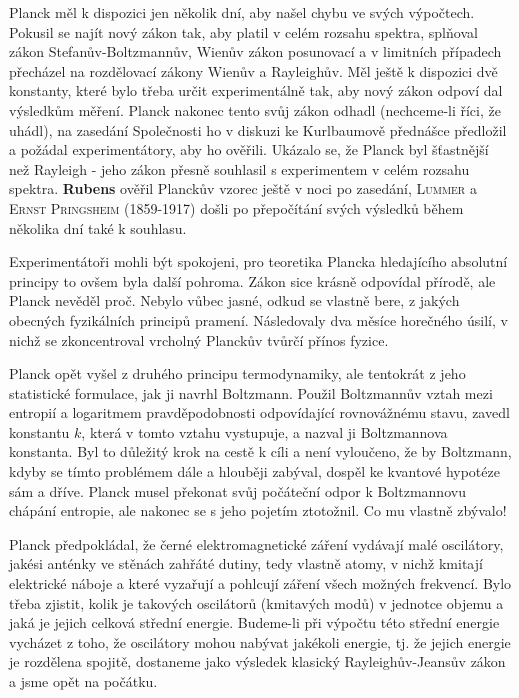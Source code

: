         Planck měl k dispozici jen několik dní, aby našel chybu ve svých výpočtech. Pokusil se najít
        nový zákon tak, aby platil v celém rozsahu spektra, splňoval zákon Stefanův-Boltzmannův,
        Wienův zákon posunovací a v limitních případech přecházel na rozdělovací zákony Wienův a
        Rayleighův. Měl ještě k dispozici dvě konstanty, které bylo třeba určit experimentálně tak,
        aby nový zákon odpoví dal výsledkům měření. Planck nakonec tento svůj zákon odhadl
        (nechceme-li říci, že uhádl), na zasedání Společnosti ho v diskuzi ke Kurlbaumově přednášce
        předložil a požádal experimentátory, aby ho ověřili. Ukázalo se, že Planck byl šťastnější
        než Rayleigh - jeho zákon přesně souhlasil s experimentem v celém rozsahu spektra.
        \textbf{Rubens} ověřil Planckův vzorec ještě v noci po zasedání, \textsc{Lummer} a
        \textsc{Ernst Pringsheim} (1859-1917) došli po přepočítání svých výsledků během několika dní
        také k souhlasu.

        Experimentátoři mohli být spokojeni, pro teoretika Plancka hledajícího absolutní principy to
        ovšem byla další pohroma. Zákon sice krásně odpovídal přírodě, ale Planck nevěděl proč.
        Nebylo vůbec jasné, odkud se vlastně bere, z jakých obecných fyzikálních principů pramení.
        Následovaly dva měsíce horečného úsilí, v nichž se zkoncentroval vrcholný Planckův tvůrčí
        přínos fyzice.

        Planck opět vyšel z druhého principu termodynamiky, ale tentokrát z jeho statistické
        formulace, jak ji navrhl Boltzmann. Použil Boltzmannův vztah mezi entropií a logaritmem
        pravděpodobnosti odpovídající rovnovážnému stavu, zavedl konstantu \(k\), která v tomto
        vztahu vystupuje, a nazval ji Boltzmannova konstanta. Byl to důležitý krok na cestě k cíli a
        není vyloučeno, že by Boltzmann, kdyby se tímto problémem dále a hlouběji zabýval, dospěl ke
        kvantové hypotéze sám a dříve. Planck musel překonat svůj počáteční odpor k Boltzmannovu
        chápání entropie, ale nakonec se s jeho pojetím ztotožnil. Co mu vlastně zbývalo!

        Planck předpokládal, že černé elektromagnetické záření vydávají malé oscilátory, jakési
        anténky ve stěnách zahřáté dutiny, tedy vlastně atomy, v nichž kmitají elektrické náboje a
        které vyzařují a pohlcují záření všech možných frekvencí. Bylo třeba zjistit, kolik je
        takových oscilátorů (kmitavých modů) v jednotce objemu a jaká je jejich celková střední
        energie. Budeme-li při výpočtu této střední energie vycházet z toho, že oscilátory mohou
        nabývat jakékoli energie, tj. že jejich energie je rozdělena spojitě, dostaneme jako
        výsledek klasický Rayleighův-Jeansův zákon a jsme opět na počátku.

